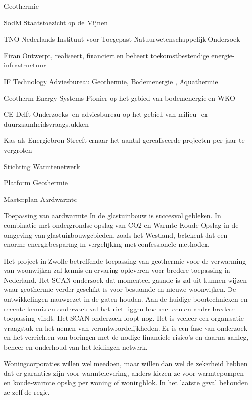 \begin{voorstel}{Geothermie}
\begin{overwegingen}
SodM    Staatstoezicht op de Mijnen

TNO    Nederlands Instituut voor Toegepast Natuurwetenschappelijk Onderzoek

Firan    Ontwerpt, realiseert, financiert en beheert toekomstbestendige energie-infrastructuur

IF Technology    Adviesbureau Geothermie, Bodemenergie , Aquathermie

Geotherm Energy Systems    Pionier op het gebied van bodemenergie en WKO

CE Delft        Onderzoeks- en adviesbureau op het gebied van milieu- en duurzaamheidsvraagstukken

Kas als Energiebron    Streeft ernaar het aantal gerealiseerde projecten per jaar te vergroten

Stichting Warmtenetwerk

Platform Geothermie

Masterplan Aardwarmte
\end{overwegingen}

\begin{aanbevelingen}
Toepassing van aardwarmte In de glastuinbouw is succesvol gebleken. In combinatie met ondergrondse opslag van CO2 en Warmte-Koude Opslag in de omgeving van glastuinbouwgebieden, zoals het Westland, betekent dat een enorme energiebesparing in vergelijking met confessionele methoden.

Het project in Zwolle betreffende toepassing van geothermie voor de verwarming van woonwijken zal kennis en ervaring opleveren voor bredere toepassing in Nederland.  Het SCAN-onderzoek dat momenteel gaande is zal uit  kunnen wijzen waar geothermie verder geschikt is voor bestaande en nieuwe woonwijken. De ontwikkelingen nauwgezet in de gaten houden. Aan de huidige boortechnieken en recente kennis en onderzoek zal het niet liggen hoe snel een en ander bredere toepassing vindt. Het SCAN-onderzoek loopt nog. Het is veeleer een organisatie-vraagstuk en het nemen van verantwoordelijkheden. Er is een fase van onderzoek en het verrichten van boringen met de nodige financiele risico’s en daarna aanleg, beheer en onderhoud van het leidingen-netwerk. 

Woningcorporaties willen wel meedoen, maar willen dan wel de zekerheid hebben dat er garanties zijn voor warmtelevering, anders kiezen ze voor warmtepompen en koude-warmte opslag per woning of woningblok. In het laatste geval behouden ze zelf de regie.
\end{aanbevelingen}


\end{voorstel}
